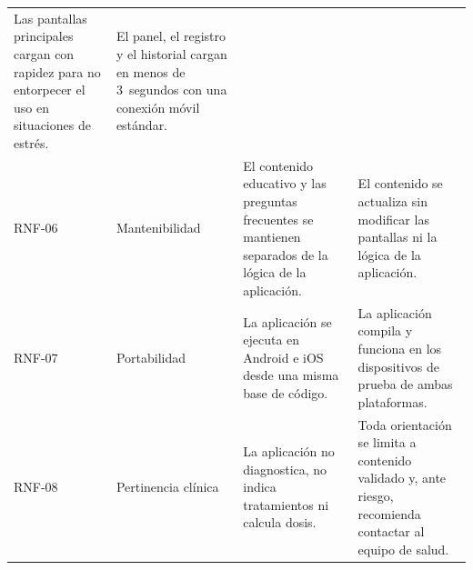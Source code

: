 \begin{xltabular}{\textwidth}{P{0.40}P{0.80}P{1.40}P{1.40}}
    Las pantallas principales cargan con rapidez para no entorpecer el uso en
    situaciones de estrés. &
    El panel, el registro y el historial cargan en menos de 3~segundos con una
    conexión móvil estándar. \\
    RNF-06 & Mantenibilidad &
    El contenido educativo y las preguntas frecuentes se mantienen separados de
    la lógica de la aplicación. &
    El contenido se actualiza sin modificar las pantallas ni la lógica de la
    aplicación. \\
    RNF-07 & Portabilidad &
    La aplicación se ejecuta en Android e iOS desde una misma base de código. &
    La aplicación compila y funciona en los dispositivos de prueba de ambas
    plataformas. \\
    RNF-08 & Pertinencia clínica &
    La aplicación no diagnostica, no indica tratamientos ni calcula dosis. &
    Toda orientación se limita a contenido validado y, ante riesgo, recomienda
    contactar al equipo de salud. \\
\end{xltabular}
\endgroup
